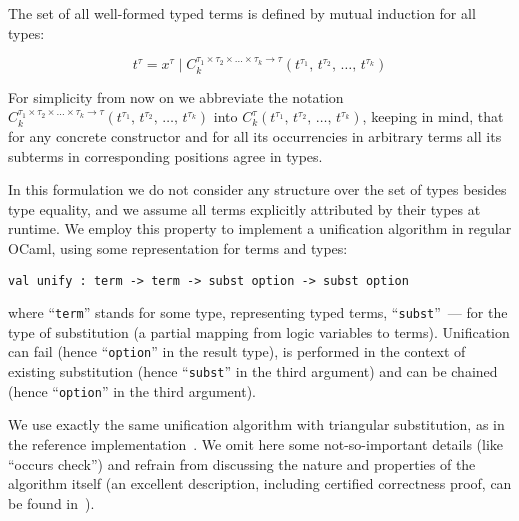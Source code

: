 The set of all well-formed typed terms is defined by mutual induction for all types:

$$
t^\tau=x^\tau\mid C_k^{\tau_1\times\tau_2\times\dots\times\tau_k\to\tau}(t^{\tau_1},\,t^{\tau_2},\,\dots,\,t^{\tau_k})
$$

For simplicity from now on we abbreviate the notation $C_k^{\tau_1\times\tau_2\times\dots\times\tau_k\to\tau}(t^{\tau_1},\,t^{\tau_2},\,\dots,\,t^{\tau_k})$ into 
$C_k^\tau(t^{\tau_1},\,t^{\tau_2},\,\dots,\,t^{\tau_k})$, keeping in mind, that for any concrete constructor and for all its occurrencies 
in arbitrary terms all its subterms in corresponding positions agree in types. 

\begin{comment}
We need also to define the notion of a subterm  $t^\tau[p]$ of a term $t^\tau$ at given position $p$:

$$
\begin{array}{rcl}
 p=\epsilon\mid\{1, 2, 3,\dots\}\bullet p&-&\mbox{the set of positions}\\
 t^\tau[\epsilon]=t^\tau&-&\mbox{base case}\\
 C_k^\tau(t_1^{\tau_1},\,t_2^{\tau_2},\dots,\,t_k^{\tau_k})[i\bullet p]=t_i^{\tau_i}[p], 1\le i \le k&-&\mbox{inductive case}
\end{array}
$$
\end{comment}

In this formulation we do not consider any structure over the set of types besides type equality, and we assume all terms explicitly 
attributed by their types at runtime. We employ this property to implement a unification algorithm in regular OCaml, using some
representation for terms and types:

\begin{lstlisting}[mathescape=true]
    val unify : term -> term -> subst option -> subst option
\end{lstlisting}

\noindent where ``\lstinline{term}'' stands for some type, representing typed terms, ``\lstinline{subst}''~--- for the type of 
substitution (a partial mapping from logic variables to terms). Unification can fail (hence ``\lstinline{option}'' in the result type), 
is performed in the context of existing substitution (hence ``\lstinline{subst}'' in the third argument) and can be 
chained (hence ``\lstinline{option}'' in the third argument). 

We use exactly the same unification algorithm with triangular substitution, as in the reference implementation~\cite{MicroKanren}. We
omit here some not-so-important details (like ``occurs check'') and refrain from discussing the nature and properties of the algorithm
itself (an excellent description, including certified correctness proof, can be found in~\cite{Kumar}).


